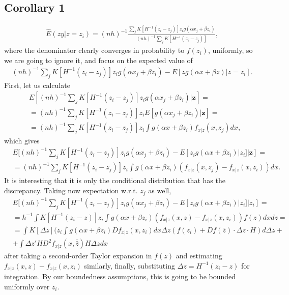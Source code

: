 \documentclass{article}
\theoremstyle{definition}
\theoremstyle{remark}
\begin{document}
\subsection{Corollary 1}
\begin{align}
\hat{E}(zy|z=z_i)= (nh)^{-1}\frac{\sum_j K[H^{-1}(z_i-z_j)] z_i g(\alpha x_j + \beta z_i)}{(nh)^{-1}\sum_j K[H^{-1}(z_i-z_j)]},
\end{align}
where the denominator clearly converges in probability to $f(z_i)$, uniformly, so we are going to ignore it, and focus on the expected value of
\begin{align}
(nh)^{-1}\sum_j K[H^{-1}(z_i-z_j)] z_i g(\alpha x_j + \beta z_i)-E[z g(\alpha x + \beta z)|z=z_i].
\end{align}
First, let us calculate
\begin{align}
&E[(nh)^{-1}\sum_j K[H^{-1}(z_i-z_j)] z_i g(\alpha x_j + \beta z_i)|\mathbf{z}]= \\
&=(nh)^{-1}\sum_j K[H^{-1}(z_i-z_j)] z_i E[g(\alpha x_j + \beta z_i)|\mathbf{z}]= \nonumber \\
&= (nh)^{-1}\sum_j K[H^{-1}(z_i-z_j)] z_i \int g(\alpha x + \beta z_i) f_{x|z}(x,z_j) dx,\nonumber
\end{align}
which gives
\begin{align}
&E[(nh)^{-1}\sum_j K[H^{-1}(z_i-z_j)] z_i g(\alpha x_j + \beta z_i)-E[z_i g(\alpha x + \beta z_i)|z_i]|\mathbf{z}]= \\
&=(nh)^{-1}\sum_j K[H^{-1}(z_i-z_j)] z_i \int g(\alpha x + \beta z_i) (f_{x|z}(x,z_j)-f_{x|z}(x,z_i)) dx. \nonumber
\end{align}
It is interesting that it is only the conditional distribution that has the discrepancy. Taking now expectation w.r.t. $z_j$ as well,
\begin{align}
&E[(nh)^{-1}\sum_j K[H^{-1}(z_i-z_j)] z_i g(\alpha x_j + \beta z_i)-E[z_i g(\alpha x + \beta z_i)|z_i]|z_i]= \\
&=h^{-1}\int K[H^{-1}(z_i-z)] z_i \int g(\alpha x + \beta z_i) (f_{x|z}(x,z)-f_{x|z}(x,z_i)) f(z) dxdz= \nonumber \\
&= \int K[\Delta z] (z_i \int g(\alpha x+\beta z_i)Df_{x|z}(x,z_i) dx \Delta z (f(z_i) + Df(\bar{z})\cdot \Delta z \cdot H ) d \Delta z + \nonumber\\
&+ \int \Delta z' H  D^2f_{x|z}(x,\bar{\bar{z}})H \Delta z dx \nonumber
\end{align}
after taking a second-order Taylor expansion in $f(z)$ and estimating $f_{x|z}(x,z)-f_{x|z}(x,z_i)$ similarly, finally, substituting $\Delta z= H^{-1}(z_i-z)$ for integration. By our boundedness assumptions, this is going to be bounded uniformly over $z_i$.
\end{document}
